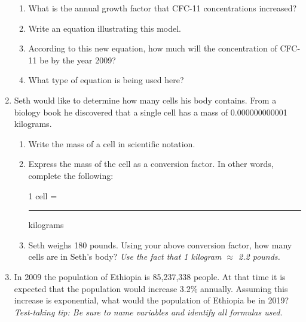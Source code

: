 \documentclass[12pt]{article}
\begin{document}
\begin{enumerate}
\begin{enumerate}
\item What is the annual growth factor that CFC-11 concentrations increased?  
\vfill
\item Write an equation illustrating this model.
\vfill
\item According to this new equation, how much will the concentration of CFC-11 be by the year 2009?
\vfill
\item What type of equation is being used here?
\vfill
\end{enumerate}





\newpage
\item  Seth would like to determine how many cells his body contains.  From a biology book he discovered that a single cell has a mass of 0.000000000001 kilograms.  

\begin{enumerate}
\item Write the mass of a cell in scientific notation.
\vfill
\item Express the mass of the cell as a conversion factor.  In other words, complete the following:
\vspace{0.2in}
\begin{center} 1 cell = \rule{1.5in}{.01in} kilograms \end{center}
\vspace{0.2in}

\item Seth weighs 180 pounds. Using your above conversion factor, how many cells are in Seth's body?  \emph{Use the fact that 1 kilogram $\approx$ 2.2 pounds.}
\vfill



\end{enumerate}

\item In 2009 the population of Ethiopia is 85,237,338 people.  At that time it is expected that the population would increase 3.2\% annually.  Assuming this increase is exponential, what would the population of Ethiopia be in 2019?  \emph{Test-taking tip: Be sure to name variables and identify all formulas used.}
\vfill

\end{enumerate}
\end{document}
